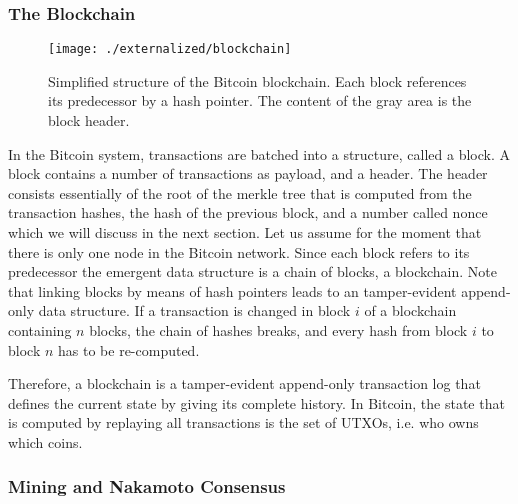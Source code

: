 \subsubsection{The Blockchain}
\label{sec:blockchain}

 \begin{figure*}[!t]
    \centering
    \texttt{[image: ./externalized/blockchain]}
    \caption{Simplified structure of the Bitcoin blockchain. Each block references its predecessor by a hash pointer. The content of the gray area is the block header.}
    \label{fig:blockchain}
  \end{figure*}

In the Bitcoin system, transactions are batched into a structure, called a block. A block contains a number of  transactions as payload, and a header. The header consists essentially of the root of the merkle tree that is computed from the transaction hashes, the hash of the previous block, and a number called nonce which we will discuss in the next section. Let us assume for the moment that there is only one node in the Bitcoin network. Since each block refers to its predecessor the emergent data structure is a chain of blocks, a blockchain. Note that linking blocks by means of hash pointers leads to an tamper-evident append-only data structure. If a transaction is changed in block $i$ of a blockchain containing $n$ blocks, the chain of hashes breaks, and every hash from block $i$ to block $n$ has to be re-computed.

Therefore, a blockchain is a tamper-evident append-only transaction log that defines the current state by giving its complete history. In Bitcoin, the state that is computed by replaying all transactions is the set of UTXOs, i.e. who owns which coins.

\subsubsection{Mining and Nakamoto Consensus}
\label{sec:mining}

